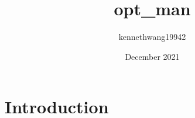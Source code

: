 \documentclass{article}
\title{opt_man}
\author{kennethwang19942 }
\date{December 2021}
\begin{document}
\maketitle

\section{Introduction}
\end{document}
